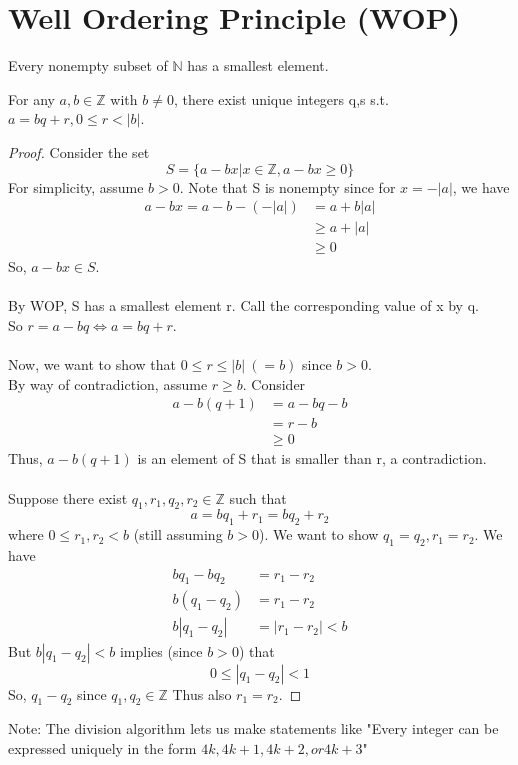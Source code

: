 \section{Well Ordering Principle (WOP)}
    Every nonempty subset of $\mathbb{N}$ has a smallest element.
    \begin{theorem} 
        For any $a,b\in\mathbb{Z}$ with $b\neq 0$, there exist unique integers q,s s.t.
        $a=bq+r, 0\leq r<|b|$.
        \begin{proof}
            Consider the set 
            \[ S=\{a-bx|x\in\mathbb{Z}, a-bx\geq 0\} \]
            For simplicity, assume $b>0$. Note that S is nonempty since for $x=-|a|$, we have
            \begin{align*}
                a-bx = a-b-(-|a|) &= a+b|a| \\
                & \geq a+|a| \\
                & \geq 0
            \end{align*}
            So, $a-bx\in S$. \\\\
            By WOP, S has a smallest element r. Call the corresponding value of x by q. \\
            So $r=a-bq \Leftrightarrow a=bq+r$. \\\\
            Now, we want to show that $0\leq r\leq |b|\ (=b)$ since $b>0$. \\
            By way of contradiction, assume $r\geq b$. 
            Consider
            \begin{align*}
                a-b(q+1) &= a-bq-b \\
                &= r-b \\
                & \geq 0
            \end{align*}
            Thus, $a-b(q+1)$ is an element of S that is smaller than r, a contradiction. \\\\
            Suppose there exist $q_1,r_1,q_2,r_2\in\mathbb{Z}$ such that 
            \[ a=bq_1+r_1 = bq_2+r_2 \]
            where $0\leq r_1,r_2 < b$ (still assuming $b > 0$).
            We want to show $q_1=q_2, r_1=r_2$.
            We have 
            \begin{align*}
                bq_1-bq_2 &= r_1-r_2 \\
                b(q_1-q_2) &= r_1-r_2 \\
                b|q_1-q_2| &= |r_1-r_2| < b
            \end{align*}
            But $b|q_1-q_2| < b$ implies (since $b > 0$) that 
            \[ 0\leq |q_1-q_2|<1 \]
            So, $q_1-q_2$ since $q_1,q_2\in\mathbb{Z}$
            Thus also $r_1=r_2$.
        \end{proof}
    Note: The division algorithm lets us make statements like "Every integer can be 
    expressed uniquely in the form $4k, 4k+1, 4k+2, or 4k+3$"
    \end{theorem}

